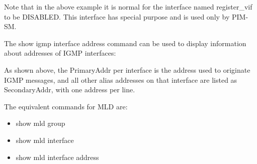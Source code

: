 Note that in the above example it is normal for the interface named
{\stt register\_vif} to be {\stt DISABLED}. This interface has special
purpose and is used only by PIM-SM.

\vspace{0.1in}
The {\stt show igmp interface address} command can be used to display
information about addresses of IGMP interfaces:

\vspace{0.1in}
\noindent{}
\vspace{0.1in}

As shown above, the {\stt PrimaryAddr} per interface is the address
used to originate IGMP messages, and all other alias addresses on that
interface are listed as {\stt SecondaryAddr}, with one address per
line.

The equivalent commands for MLD are:
\begin{itemize}
\item {\stt show mld group}
\item {\stt show mld interface}
\item {\stt show mld interface address}
\end{itemize}
